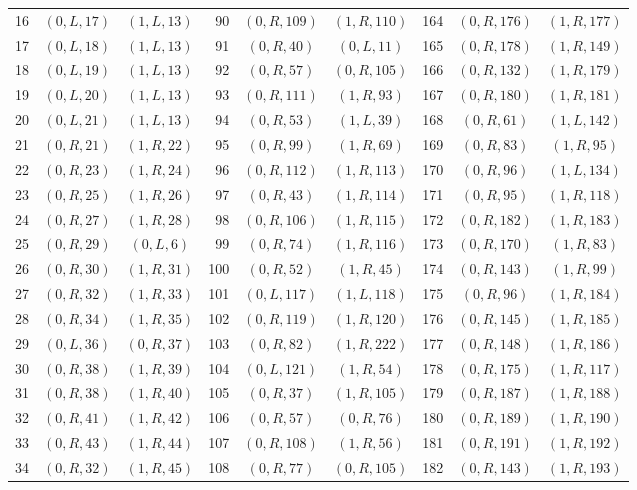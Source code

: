 {\begin{longtable}{rcc@{\qquad}rcc@{\qquad}rcc}
16 & $(0,L,17)$ & $(1,L,13)$ & 90 & $(0,R,109)$ & $(1,R,110)$ & 164 & $(0,R,176)$ & $(1,R,177)$\\
17 & $(0,L,18)$ & $(1,L,13)$ & 91 & $(0,R,40)$ & $(0,L,11)$ & 165 & $(0,R,178)$ & $(1,R,149)$\\
18 & $(0,L,19)$ & $(1,L,13)$ & 92 & $(0,R,57)$ & $(0,R,105)$ & 166 & $(0,R,132)$ & $(1,R,179)$\\
19 & $(0,L,20)$ & $(1,L,13)$ & 93 & $(0,R,111)$ & $(1,R,93)$ & 167 & $(0,R,180)$ & $(1,R,181)$\\
20 & $(0,L,21)$ & $(1,L,13)$ & 94 & $(0,R,53)$ & $(1,L,39)$ & 168 & $(0,R,61)$ & $(1,L,142)$\\
21 & $(0,R,21)$ & $(1,R,22)$ & 95 & $(0,R,99)$ & $(1,R,69)$ & 169 & $(0,R,83)$ & $(1,R,95)$\\
22 & $(0,R,23)$ & $(1,R,24)$ & 96 & $(0,R,112)$ & $(1,R,113)$ & 170 & $(0,R,96)$ & $(1,L,134)$\\
23 & $(0,R,25)$ & $(1,R,26)$ & 97 & $(0,R,43)$ & $(1,R,114)$ & 171 & $(0,R,95)$ & $(1,R,118)$\\
24 & $(0,R,27)$ & $(1,R,28)$ & 98 & $(0,R,106)$ & $(1,R,115)$ & 172 & $(0,R,182)$ & $(1,R,183)$\\
25 & $(0,R,29)$ & $(0,L,6)$ & 99 & $(0,R,74)$ & $(1,R,116)$ & 173 & $(0,R,170)$ & $(1,R,83)$\\
26 & $(0,R,30)$ & $(1,R,31)$ & 100 & $(0,R,52)$ & $(1,R,45)$ & 174 & $(0,R,143)$ & $(1,R,99)$\\
27 & $(0,R,32)$ & $(1,R,33)$ & 101 & $(0,L,117)$ & $(1,L,118)$ & 175 & $(0,R,96)$ & $(1,R,184)$\\
28 & $(0,R,34)$ & $(1,R,35)$ & 102 & $(0,R,119)$ & $(1,R,120)$ & 176 & $(0,R,145)$ & $(1,R,185)$\\
29 & $(0,L,36)$ & $(0,R,37)$ & 103 & $(0,R,82)$ & $(1,R,222)$ & 177 & $(0,R,148)$ & $(1,R,186)$\\
30 & $(0,R,38)$ & $(1,R,39)$ & 104 & $(0,L,121)$ & $(1,R,54)$ & 178 & $(0,R,175)$ & $(1,R,117)$\\
31 & $(0,R,38)$ & $(1,R,40)$ & 105 & $(0,R,37)$ & $(1,R,105)$ & 179 & $(0,R,187)$ & $(1,R,188)$\\
32 & $(0,R,41)$ & $(1,R,42)$ & 106 & $(0,R,57)$ & $(0,R,76)$ & 180 & $(0,R,189)$ & $(1,R,190)$\\
33 & $(0,R,43)$ & $(1,R,44)$ & 107 & $(0,R,108)$ & $(1,R,56)$ & 181 & $(0,R,191)$ & $(1,R,192)$\\
34 & $(0,R,32)$ & $(1,R,45)$ & 108 & $(0,R,77)$ & $(0,R,105)$ & 182 & $(0,R,143)$ & $(1,R,193)$\\

\end{longtable}}
